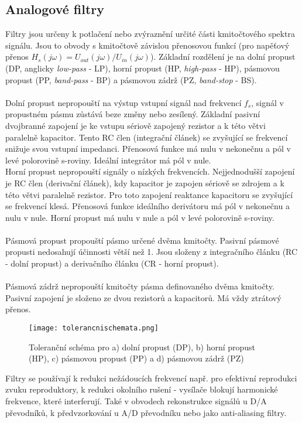\subsection{Analogové filtry}
Filtry jsou určeny k potlačení nebo zvýraznění určité části kmitočtového spektra signálu. Jsou to obvody s kmitočtově závislou přenosovou funkcí (pro napěťový přenos $H_s(j \omega) = U_{out}(j \omega)/U_{in}(j \omega)$). Základní rozdělení je na dolní propust (DP, anglicky \textit{low-pass} - LP), horní propust (HP, \textit{high-pass} - HP), pásmovou propust (PP, \textit{band-pass} - BP) a pásmovou zádrž (PZ, \textit{band-stop} - BS). \\
\\
Dolní propust nepropouští na výstup vstupní signál nad frekvencí $f_s$, signál v propustném pásmu zůstává beze změny nebo zesílený. Základní pasivní dvojbranné zapojení je ke vstupu sériově zapojený rezistor a k této větvi paralelně kapacitor. Tento RC člen (integrační článek) se zvyšující se frekvencí snižuje svou vstupní impedanci. Přenosová funkce má nulu v nekonečnu a pól v levé polorovině s-roviny. Ideální integrátor má pól v nule. \\
Horní propust nepropouští signály o nízkých frekvencích. Nejjednodušší zapojení je RC člen (derivační článek), kdy kapacitor je zapojen sériově se zdrojem a k této větvi paralelně rezistor. Pro toto zapojení reaktance kapacitoru se zvyšující se frekvencí klesá. Přenosová funkce ideálního derivátoru má pól v nekonečnu a nulu v nule. Horní propust má nulu v nule a pól v levé polorovině s-roviny.\\
\\
Pásmová propust propouští pásmo určené dvěma kmitočty. Pasivní pásmové propusti nedosahují účinnosti větší než 1. Jsou složeny z integračního článku (RC - dolní propust) a derivačního článku (CR - horní propust).\\
\\
Pásmová zádrž nepropouští kmitočty pásma definovaného dvěma kmitočty. Pasivní zapojení je složeno ze dvou rezistorů a kapacitorů. Má vždy ztrátový přenos.
\begin{figure}[h]
\centering
\texttt{[image: tolerancnischemata.png]}
\caption[Toleranční schéma dolní propusti (DP), horní propusti (HP), pásmové propusti (PP) a pásmové zádrže]{Toleranční schéma pro a) dolní propust (DP), b) horní propust (HP), c) pásmovou propust (PP) a d) pásmovou zádrž (PZ)\cite{1}}
\end{figure}
\noindent Filtry se používají k redukci nežádoucích frekvencí např. pro efektivní reprodukci zvuku reproduktory, k redukci okolního rušení - vysílače blokují harmonické frekvence, které interferují. Také v obvodech rekonstrukce signálů u D/A převodníků, k předvzorkování u A/D převodníku nebo jako anti-aliasing filtry.\\\\
